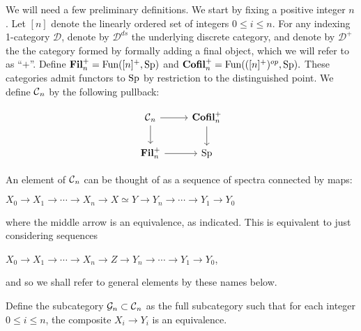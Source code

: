 



We will need a few preliminary definitions.  We start by fixing a positive integer $n$.  
Let $[n]$ denote the linearly ordered set of integers $0\leq i\leq n$. For any indexing 1-category $\mathcal{D}$, denote by $\mathcal{D}^{ds}$ the underlying discrete category, and denote by $\mathcal{D}^+$ the the category formed by formally adding a final object, which we will refer to as ``$+$''.  Define $\operatorname{\mathbf{Fil}}_n^+ = \operatorname{\text{Fun}}([n]^+, \operatorname{\mathrm{Sp}})$ and $\operatorname{\mathbf{Cofil}}_n^+ = \operatorname{\text{Fun}}(([n]^+)^{op},\operatorname{\mathrm{Sp}}).$  These categories admit functors to $\operatorname{\mathrm{Sp}}$ by restriction to the distinguished point.  We define $\operatorname{\mathcal{C}}_n$ by the following pullback:

\begin{equation}\label{dia:fundpb}
\begin{tikzcd}
\C_n \arrow[r] \arrow[d]&  \Cofil_n^+ \arrow[d]\\
\Fil_n^+ \arrow[r]& \Sp
\end{tikzcd}
\end{equation}


An element of $\operatorname{\mathcal{C}}_n$ can be thought of as a sequence of spectra connected by maps:
\begin{center}
$X_0 \longrightarrow X_1 \longrightarrow \cdots \longrightarrow X_n \longrightarrow X \simeq Y \longrightarrow Y_n \longrightarrow \cdots \longrightarrow Y_1 \longrightarrow Y_0$
\end{center}
where the middle arrow is an equivalence, as indicated.  This is equivalent to just considering sequences
\begin{center}
$X_0 \longrightarrow X_1 \longrightarrow \cdots \longrightarrow X_n \longrightarrow Z \longrightarrow Y_n \longrightarrow \cdots \longrightarrow Y_1 \longrightarrow Y_0$,
\end{center}
and so we shall refer to general elements by these names below.   


Define the subcategory $\mathcal{G}_n\subset \operatorname{\mathcal{C}}_n$ as the full subcategory such that for each integer $0\leq i\leq n$, the composite $X_i \longrightarrow Y_i$ is an equivalence.  

